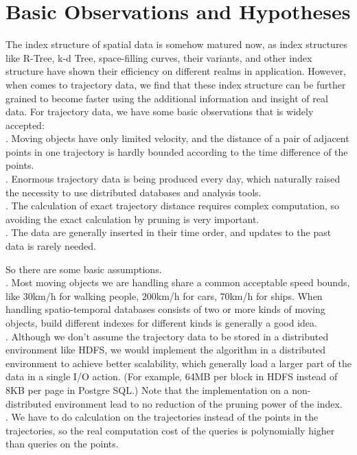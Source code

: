 \documentclass[sigplan]{acmart}
\begin{document}
\section{Basic Observations and Hypotheses}
The index structure of spatial data is somehow matured now, as index structures like R-Tree, k-d Tree, space-filling curves, their variants, and other index structure have shown their efficiency on different realms in application. However, when comes to trajectory data, we find that these index structure can be further grained to become faster using the additional information and insight of real data. For trajectory data, we have some basic observations that is widely accepted: \\
. Moving objects have only limited velocity, and the distance of a pair of adjacent points in one trajectory is hardly bounded according to the time difference of the points.\\
. Enormous trajectory data is being produced every day, which naturally raised the necessity to use distributed databases and analysis tools.\\
. The calculation of exact trajectory distance requires complex computation, so avoiding the exact calculation by pruning is very important.\\
. The data are generally inserted in their time order, and updates to the past data is rarely needed.\\
\par
So there are some basic assumptions.\\
. Most moving objects we are handling share a common acceptable speed bounds, like 30km/h for walking people, 200km/h for cars, 70km/h for ships. When handling spatio-temporal databases consists of two or more kinds of moving objects, build different indexes for different kinds is generally a good idea.\\
. Although we don't assume the trajectory data to be stored in a distributed environment like HDFS, we would implement the algorithm in a distributed environment to achieve better scalability, which generally load a larger part of the data in a single I/O action. (For example, 64MB per block in HDFS instead of 8KB per page in Postgre SQL.) Note that the implementation on a non-distributed environment lead to no reduction of the pruning power of the index. \\
. We have to do calculation on the trajectories instead of the points in the trajectories, so the real computation cost of the queries is polynomially higher than queries on the points.\par
\end{document}
